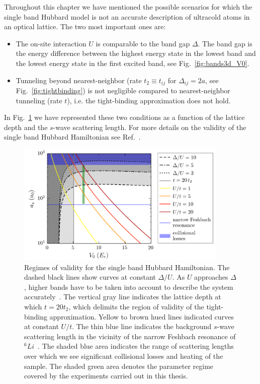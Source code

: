Throughout this chapter we have mentioned the possible scenarios for which the
single band Hubbard model is not an accurate description of ultracold atoms in
an optical lattice.  The two most important ones are:
\begin{itemize} 
\item The on-site interaction $U$ is comparable to the band gap $\Delta$.  The
band gap is the energy difference between the highest energy state in the
lowest band and the lowest energy state in the first excited band, see
Fig.~\ref{fig:bands3d_V0}. \item Tunneling beyond nearest-neighbor (rate
$t_{2}\equiv t_{ij}$ for $\Delta_{ij}=2a$, see Fig.~\ref{fig:tightbinding}) is
not negligible compared to nearest-neighbor tunneling (rate $t$), i.e.  the
tight-binding approximation does not hold. 
\end{itemize}
In Fig.~\ref{fig:hubbardvalid} we have represented these two conditions as a
function of the lattice depth and the $s$-wave scattering length.  For more
details on the validity of the single band Hubbard Hamiltonian see
Ref.~\cite{Werner2005}. 
\begin{figure}
\centering
\includegraphics[width=0.9\textwidth]{../figures/BandStructure_figures/singleband.png}
\caption[Regimes of validity for the single band Hubbard Hamiltonian]{\small
Regimes of validity for the single band Hubbard Hamiltonian.   The dashed black
lines show curves at constant $\Delta/U$.  As $U$ approaches $\Delta$, higher
bands have to be taken into account to describe the system
accurately~\cite{Werner2005}.  The vertical gray line indicates the lattice
depth at which $t = 20t_{2}$, which delimits the region of validity of the
tight-binding approximation.  Yellow to brown hued lines indicated curves at
constant $U/t$.  The thin blue line indicates the background $s$-wave
scattering length in the vicinity of the narrow Feshbach resonance of
$^{6}Li$~\cite{Strecker2003,Zurn2013}.  The shaded blue area indicates the
range of scattering lengths over which we see significant collisional losses
and heating of the sample.   The shaded green area denotes the parameter regime
covered by the experiments carried out in this thesis.} 
\label{fig:hubbardvalid}
\end{figure}


